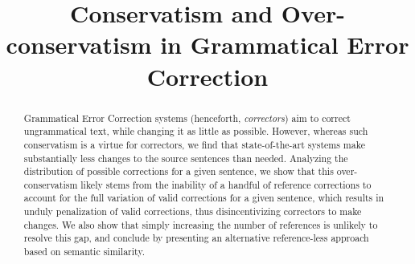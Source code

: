 \documentclass[letter,11pt]{article}
\begin{document}
\title{Conservatism and Over-conservatism in Grammatical Error Correction}
\maketitle

\begin{abstract}
  Grammatical Error Correction systems (henceforth, {\it correctors}) aim to correct ungrammatical text,
  while changing it as little as possible. However, whereas such conservatism is a virtue for correctors,
  we find that state-of-the-art systems make substantially less changes to the source sentences than needed.
  Analyzing the distribution of possible corrections for a given sentence,   
  we show that this over-conservatism likely stems from
  the inability of a handful of reference corrections to account for the full variation of valid
  corrections for a given sentence, which results in unduly penalization of valid corrections,
  thus disincentivizing correctors to make changes.
  We also show that simply increasing the number of references is unlikely to resolve this gap,
  and conclude by presenting an alternative reference-less approach based on semantic similarity.
\end{abstract}
\end{document}
